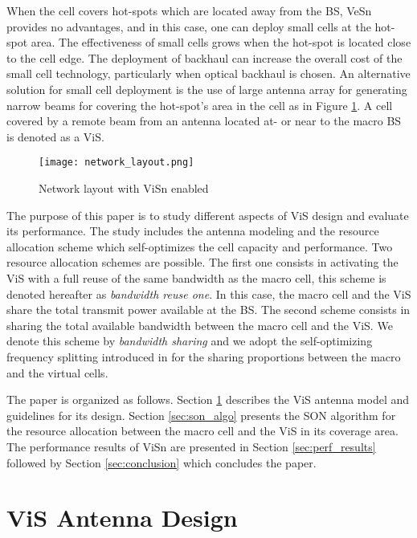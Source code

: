 \documentclass[conference]{IEEEtran}
\begin{document}
	When the cell covers hot-spots which are located away from the \ac{BS}, \ac{VeSn} provides no advantages, and in this case, one can deploy small cells at the hot-spot area. The effectiveness of small cells grows when the hot-spot is located close to the cell edge. The deployment of backhaul can increase the overall cost of the small cell technology, particularly when optical backhaul is chosen. An alternative solution for small cell deployment is the use of large antenna array for generating narrow beams for covering the hot-spot's area in the cell as in Figure \ref{fig:net_lay}. A cell covered by a remote beam from an antenna located at- or near to the macro \ac{BS} is denoted as a \ac{ViS}.

\begin{figure}[!ht]
\centering
\texttt{[image: network\_layout.png]}
\caption{Network layout with \ac{ViSn} enabled}
\label{fig:net_lay}
\end{figure}

	The purpose of this paper is to study different aspects of \ac{ViS} design and evaluate its performance. The study includes the antenna modeling and the resource allocation scheme which self-optimizes the cell capacity and performance. Two resource allocation schemes are possible. The first one consists in activating the \ac{ViS} with a full reuse of the same bandwidth as the macro cell, this scheme is denoted hereafter as \textit{bandwidth reuse one}. In this case, the macro cell and the \ac{ViS} share the total transmit power available at the \ac{BS}. The second scheme consists in sharing the total available bandwidth between the macro cell and the \ac{ViS}. We denote this scheme by \textit{bandwidth sharing} and we adopt the self-optimizing frequency splitting introduced in \cite{tall_selfoptimizingstrategies_2015} for the sharing proportions between the macro and the virtual cells.

	The paper is organized as follows. Section \ref{sec:antenna_design} describes the \ac{ViS} antenna model and guidelines for its design. Section \ref{sec:son_algo} presents the \ac{SON} algorithm for the resource allocation between the macro cell and the \ac{ViS} in its coverage area. The performance results of \ac{ViSn} are presented in Section \ref{sec:perf_results} followed by Section \ref{sec:conclusion} which concludes the paper.

\section{\ac{ViS} Antenna Design} \label{sec:antenna_design}
\end{document}
